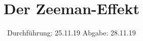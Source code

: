 

\subject{V27}
\title{Der Zeeman-Effekt}
\date{
  Durchführung: 25.11.19
  \hspace{3em}
  Abgabe: 28.11.19
}



\maketitle
\thispagestyle{empty}
\tableofcontents
\newpage




%




\newpage
\printbibliography


